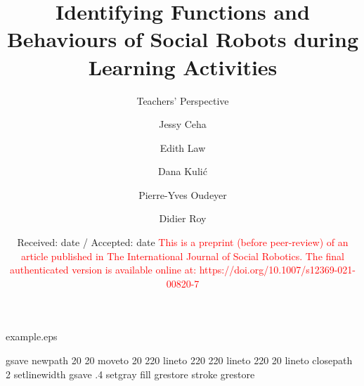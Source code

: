 
\begin{filecontents*}{example.eps}

gsave
newpath
  20 20 moveto
  20 220 lineto
  220 220 lineto
  220 20 lineto
closepath
2 setlinewidth
gsave
  .4 setgray fill
grestore
stroke
grestore
\end{filecontents*}

\RequirePackage{fix-cm}

\documentclass[twocolumn]{svjour3}          
\smartqed  
\usepackage{graphicx}
\usepackage[numbers]{natbib}
\usepackage[colorlinks,citecolor=blue,urlcolor=blue,bookmarks=false,hypertexnames=true,pagebackref=false]{hyperref}

 \usepackage{mathptmx}      




\title{Identifying Functions and Behaviours of Social Robots during Learning Activities
}
\subtitle{Teachers' Perspective}



\author{Jessy Ceha         \and
        Edith Law \and
        Dana Kuli\'c \and
        Pierre-Yves Oudeyer \and
        Didier Roy
}




\date{Received: date / Accepted: date \textcolor{red}{This is a preprint (before peer-review) of an article published in The International Journal of Social Robotics. The final authenticated version is available online at: https://doi.org/10.1007/s12369-021-00820-7}}




\maketitle

